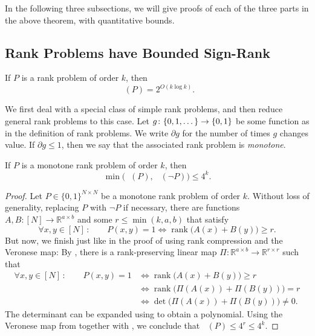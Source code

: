\documentclass{article}
\DeclareMathOperator{\signrank}{rank_\pm}
\DeclareMathOperator{\suprank}{rank_0}
\DeclareMathOperator{\rank}{rank}
\newcommand{\R}{\mathbb{R}}
\begin{document}
In the following three subsections, we will give proofs of each of the three parts in the above
theorem, with quantitative bounds.

\subsection{Rank Problems have Bounded Sign-Rank}

\begin{boxlemma}\label{lemma:signrank-rank}
	If $P$ is a rank problem of order $k$, then
	\[
	\signrank(P) = 2^{O(k\log k)}.
	\]
\end{boxlemma}

We first deal with a special class of simple rank problems, and then reduce general rank problems to this case. Let $g \colon \{0, 1, \dotsc\} \to \{0,1\}$ be some function as in the definition of rank problems. We write $\partial g$ for the number of times $g$ changes value. If $\partial g \leq 1$, then we say that the associated rank problem is \emph{monotone}.

\begin{lemma}\label{lemma:suprank-monotone}
	If $P$ is a monotone rank problem of order $k$, then 
	\[
	\min\!\Big(\suprank(P),\ \suprank(\neg P)\Big) \leq 4^k.
	\]
\end{lemma}

\begin{proof}
	Let $P\in\{0,1\}^{N\times N}$ be a monotone rank problem of order $k$. Without loss of generality, replacing $P$ with $\neg P$ if necessary, there are functions $A,B\colon [N] \to \R^{a\times b}$ and some $r\leq \min(k,a,b)$ that satisfy
	\[
	\forall x,y\in[N]\,\colon\qquad P(x,y) = 1 \iff \rank\!\big(A(x)+B(y)\big) \geq r.
	\]
	But now, we finish just like in the proof of  using rank compression and the Veronese map: By , there is a rank-preserving linear map $\Pi:\R^{a\times b}\to \R^{r\times r}$ such that
	\begin{align*}
		\forall x,y\in[N]\,\colon\qquad P(x,y) = 1 &\iff \rank\!\big(A(x)+B(y)\big) \geq r\\
		&\iff \rank\!\Big(\Pi(A(x))+\Pi(B(y))\Big) = r\\
		&\iff \det\!\Big(\Pi(A(x))+\Pi(B(y))\Big) \neq 0.
	\end{align*}
	The determinant can be expanded using  to obtain a polynomial. Using the Veronese map from  together with , we conclude that $\suprank(P)\leq 4^r\leq 4^k$.
\end{proof}
\end{document}
